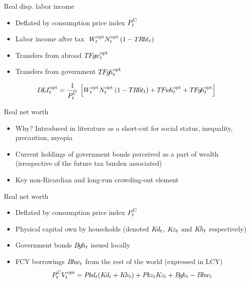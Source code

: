  \begin{frame}{Real disp. labor income}
   \begin{itemize}
    \item Deflated by consumption price index $P^\cc_t$
    \item Labor income after tax $\ W_t^{\text{opt}} N_t^{\text{opt}}\left(1- T\hspace{-0.1em}R\hspace{-0.075em}l\hspace{-0.075em}i\hspace{-0.075em}t_t\right)$
    \item Transfers from abroad $T\hspace{-0.125em}F\hspace{-0.15em}g\hspace{-0.15em}w^{\text{opt}}_t$
    \item Transfers from government $T\hspace{-0.125em}F\hspace{-0.15em}g\hspace{-0.15em}h^{\text{opt}}_t$
  \end{itemize} 
   \vspace{-5mm}
   {\small
   \begin{gather*}
   \DLI_t^\opt  = \frac{1}{P^\cc_t}\,\left[W_t^{\opt} N_t^{\opt}\left(1- \TRlit_t\right) +\TFwh^{\opt}_t + \TFgh^{\opt}_t\right]
   \end{gather*}
   }%
 \end{frame}
 
 \stopframecont
 
 \startframecont  
 
 \begin{frame}{Real net worth}
   \begin{itemize}
     \item Why? Introduced in literature as a short-cut for social status, inequality, precaution, myopia
     \item Current holdings of government bonds perceived as a part of wealth (irrespective of the future tax burden associated)
     \item Key non-Ricardian and long-run crowding-out element
  \end{itemize} 
 \end{frame}
 
 \begin{frame}{Real net worth}
  \vspace{-10mm}
  \begin{itemize}
    \item Deflated by consumption price index $P^\cc_t$
    \item Physical capital own by households (denoted $K\hspace{-0.15em}d_t$, $K\hspace{-0.15em}z_t$ and $K\hspace{-0.15em}h_t$ respectively)
    \item Government bonds $B\hspace{-0.15em}g\hspace{-0.075em}h_t$ issued locally
    \item FCY borrowings $B\hspace{-0.125em}h\hspace{-0.075em}w_t$ from the rest of the world (expressed in LCY)
    \small
    \begin{gather*}
      P^\cc_t V_t^\opt  = \Pkd_t (\Kd_t+\Kh_t)+ \Pkz_t \Kz_t +\Bgh_t-\Bhw_t
   \end{gather*}
   \end{itemize} 
 \end{frame}
 
